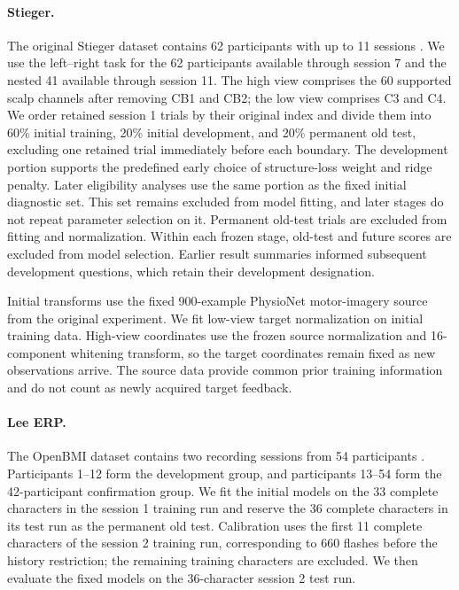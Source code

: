 \documentclass[11pt,a4paper]{article}
\begin{document}
\paragraph{Stieger.}
The original Stieger dataset contains 62 participants with up to 11 sessions \cite{stieger2021}. We use the left--right task for the 62 participants available through session 7 and the nested 41 available through session 11. The high view comprises the 60 supported scalp channels after removing CB1 and CB2; the low view comprises C3 and C4. We order retained session 1 trials by their original index and divide them into 60\% initial training, 20\% initial development, and 20\% permanent old test, excluding one retained trial immediately before each boundary. The development portion supports the predefined early choice of structure-loss weight and ridge penalty. Later eligibility analyses use the same portion as the fixed initial diagnostic set. This set remains excluded from model fitting, and later stages do not repeat parameter selection on it. Permanent old-test trials are excluded from fitting and normalization. Within each frozen stage, old-test and future scores are excluded from model selection. Earlier result summaries informed subsequent development questions, which retain their development designation.

Initial transforms use the fixed 900-example PhysioNet motor-imagery source from the original experiment. We fit low-view target normalization on initial training data. High-view coordinates use the frozen source normalization and 16-component whitening transform, so the target coordinates remain fixed as new observations arrive. The source data provide common prior training information and do not count as newly acquired target feedback.

\paragraph{Lee ERP.}
The OpenBMI dataset contains two recording sessions from 54 participants \cite{lee2019}. Participants 1--12 form the development group, and participants 13--54 form the 42-participant confirmation group. We fit the initial models on the 33 complete characters in the session 1 training run and reserve the 36 complete characters in its test run as the permanent old test. Calibration uses the first 11 complete characters of the session 2 training run, corresponding to 660 flashes before the history restriction; the remaining training characters are excluded. We then evaluate the fixed models on the 36-character session 2 test run.
\end{document}
